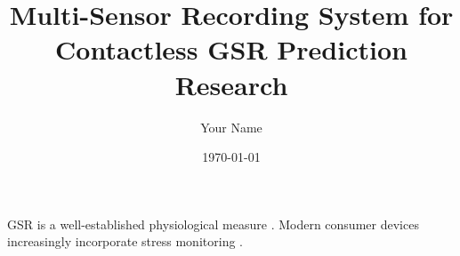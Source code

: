\documentclass{article}
\begin{document}
\title{Multi-Sensor Recording System for Contactless GSR Prediction Research}
\author{Your Name}
\date{\today}
\maketitle

GSR is a well-established physiological measure \cite{Boucsein2012}.
Modern consumer devices increasingly incorporate stress monitoring \cite{AppleHealthWatch2019,SamsungHealth2020}.






\end{document}
